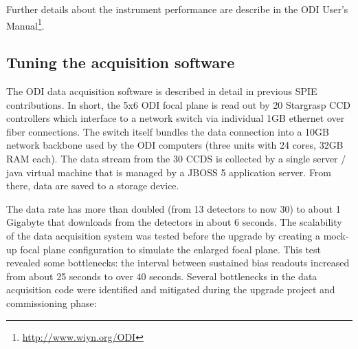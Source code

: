 \documentclass[]{spieman}
\begin{document}
Further details about the instrument performance are describe in the ODI User's
Manual\footnote{\url{http://www.wiyn.org/ODI}}.


\subsection{Tuning the acquisition software}

The ODI data acquisition software is described in detail in previous SPIE
contributions\cite{Yeatts2008,Yeatts2010}. In short, the 5x6 ODI focal plane is
read out by 20 Stargrasp CCD controllers which interface to a network switch via
individual  1GB ethernet over fiber connections. The switch itself bundles the
data connection into a 10GB network backbone used by the ODI computers (three
units with 24 cores, 32GB RAM each). The data stream from the 30 CCDS is
collected by a single server / java virtual machine that is managed by a JBOSS 5
application server. From there, data are saved to a storage device.

The data rate has more than doubled (from 13 detectors to now 30) to about 1
Gigabyte that downloads from the detectors in about 6 seconds.  The scalability
of the data acquisition system was tested before the upgrade by creating a
mock-up focal plane  configuration to simulate the enlarged focal plane. This
test revealed some bottlenecks: the interval between sustained bias readouts
increased from about 25 seconds to over 40 seconds. Several bottlenecks in the
data acquisition code were identified and mitigated during the upgrade project
and commissioning phase:
\end{document}
